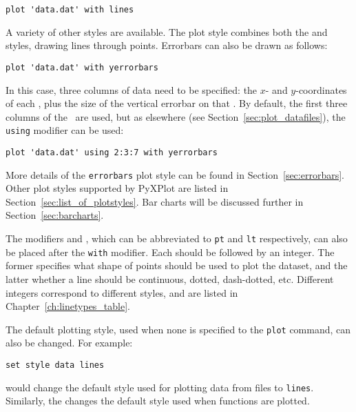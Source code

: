\begin{verbatim}
plot 'data.dat' with lines
\end{verbatim}

A variety of other styles are available. The  plot style
combines both the  and  styles, drawing lines
through points. Errorbars can also be drawn as follows:

\begin{verbatim}
plot 'data.dat' with yerrorbars
\end{verbatim}

\noindent In this case, three columns of data need to be specified: the $x$-
and $y$-coordinates of each \datapoint, plus the size of the vertical errorbar
on that \datapoint. By default, the first three columns of the \datafile\ are
used, but as elsewhere (see Section~\ref{sec:plot_datafiles}), the {\tt using}
modifier can be used:

\begin{verbatim}
plot 'data.dat' using 2:3:7 with yerrorbars
\end{verbatim}

More details of the {\tt errorbars} plot style can be found in
Section~\ref{sec:errorbars}. Other plot styles supported by PyXPlot are listed in
Section~\ref{sec:list_of_plotstyles}. Bar charts will be discussed further in
Section~\ref{sec:barcharts}.

\label{sec:pointtype}
The modifiers  and , which can be
abbreviated to {\tt pt} and {\tt lt} respectively, can also be placed after the
{\tt with} modifier. Each should be followed by an integer.  The former
specifies what shape of points should be used to plot the dataset, and the
latter whether a line should be continuous, dotted, dash-dotted, etc.
Different integers correspond to different styles, and are listed in
Chapter~\ref{ch:linetypes_table}.

The default plotting style, used when none is specified to the {\tt plot}
command, can also be changed.  For example:

\begin{verbatim}
set style data lines
\end{verbatim}

\noindent would change the default style used for plotting data from files to
{\tt lines}. Similarly, the  changes the default
style used when functions are plotted.

